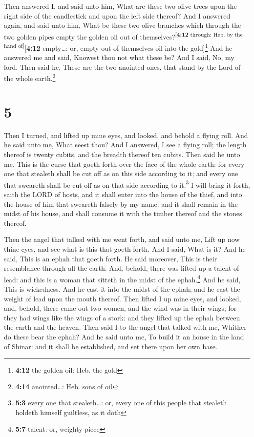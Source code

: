  Then answered I, and said unto him, What are these two
olive trees upon the right side of the candlestick and upon the left
side thereof?  And I answered again, and said unto him,
What be these two olive branches which through the two golden pipes
empty the golden oil out of themselves?\textsuperscript{{[}\textbf{4:12}
through: Heb. by the hand of{]}}{[}\textbf{4:12} empty\ldots: or, empty
out of themselves oil into the gold{]}\footnote{\textbf{4:12} the golden
  oil: Heb. the gold}  And he answered me and said,
Knowest thou not what these be? And I said, No, my lord. 
Then said he, These are the two anointed ones, that stand by the Lord of
the whole earth.\footnote{\textbf{4:14} anointed\ldots: Heb. sons of oil}

\hypertarget{section-4}{%
\section{5}\label{section-4}}

 Then I turned, and lifted up mine eyes, and looked, and
behold a flying roll.  And he said unto me, What seest
thou? And I answered, I see a flying roll; the length thereof is twenty
cubits, and the breadth thereof ten cubits.  Then said he
unto me, This is the curse that goeth forth over the face of the whole
earth: for every one that stealeth shall be cut off as on this side
according to it; and every one that sweareth shall be cut off as on that
side according to it.\footnote{\textbf{5:3} every one that
  stealeth\ldots: or, every one of this people that stealeth holdeth
  himself guiltless, as it doth}  I will bring it forth,
saith the LORD of hosts, and it shall enter into the house of the thief,
and into the house of him that sweareth falsely by my name: and it shall
remain in the midst of his house, and shall consume it with the timber
thereof and the stones thereof.

 Then the angel that talked with me went forth, and said
unto me, Lift up now thine eyes, and see what is this that goeth forth.
 And I said, What is it? And he said, This is an ephah
that goeth forth. He said moreover, This is their resemblance through
all the earth.  And, behold, there was lifted up a talent
of lead: and this is a woman that sitteth in the midst of the
ephah.\footnote{\textbf{5:7} talent: or, weighty piece} 
And he said, This is wickedness. And he cast it into the midst of the
ephah; and he cast the weight of lead upon the mouth thereof.
 Then lifted I up mine eyes, and looked, and, behold,
there came out two women, and the wind was in their wings; for they had
wings like the wings of a stork: and they lifted up the ephah between
the earth and the heaven.  Then said I to the angel that
talked with me, Whither do these bear the ephah?  And he
said unto me, To build it an house in the land of Shinar: and it shall
be established, and set there upon her own base.

